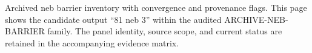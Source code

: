 Archived neb barrier inventory with convergence and provenance flags. This page shows the candidate output ``81 neb 3'' within the audited ARCHIVE-NEB-BARRIER family. The panel identity, source scope, and current status are retained in the accompanying evidence matrix.
